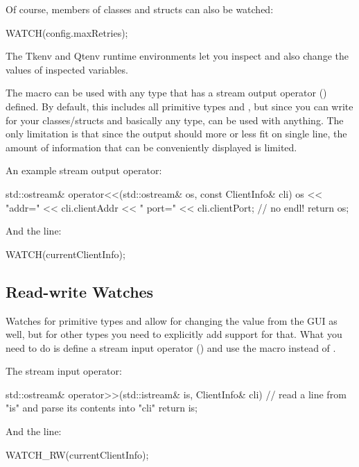 Of course, members of classes and structs can also be watched:

\begin{cpp}
WATCH(config.maxRetries);
\end{cpp}

The Tkenv and Qtenv runtime environments let you inspect and also change
the values of inspected variables.

The  macro can be used with any type that has a
stream output operator () defined. By default,
this includes all primitive types and , but since
you can write  for your classes/structs and basically
any type,  can be used with anything. The only limitation
is that since the output should more or less fit on single line, the
amount of information that can be conveniently displayed is limited.

An example stream output operator:

\begin{cpp}
std::ostream& operator<<(std::ostream& os, const ClientInfo& cli)
{
    os << "addr=" << cli.clientAddr << "  port=" << cli.clientPort; // no endl!
    return os;
}
\end{cpp}

And the  line:

\begin{cpp}
WATCH(currentClientInfo);
\end{cpp}


\subsection{Read-write Watches}

Watches for primitive types and  allow for changing
the value from the GUI as well, but for other types you need to explicitly
add support for that. What you need to do is define a stream input
operator () and use the  macro instead of
.

The stream input operator:

\begin{cpp}
std::ostream& operator>>(std::istream& is, ClientInfo& cli)
{
    // read a line from "is" and parse its contents into "cli"
    return is;
}
\end{cpp}

And the  line:

\begin{cpp}
WATCH_RW(currentClientInfo);
\end{cpp}


